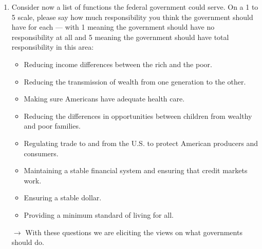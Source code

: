 \documentclass[12pt]{article}
\begin{document}
\begin{enumerate}
    \item Consider now a list of functions the federal government could serve.  On a 1 to 5 scale, please say how much responsibility you think the government should have for each — with 1 meaning the government should have no responsibility at all and 5 meaning the government should have total responsibility in this area:
    \begin{itemize}
        \item Reducing income differences between the rich and the poor.
        \item Reducing the transmission of wealth from one generation to the other.
        \item Making sure Americans have adequate health care.
        \item Reducing the differences in opportunities between children from wealthy and poor families.
        \item Regulating trade to and from the U.S. to protect American producers and consumers.
        \item Maintaining a stable financial system and ensuring that credit markets work.
        \item Ensuring a stable dollar.
        \item Providing a minimum standard of living for all.
    \end{itemize} $\rightarrow$ With these questions we are eliciting the views on what governments should do.  
\end{enumerate}
\end{document}
